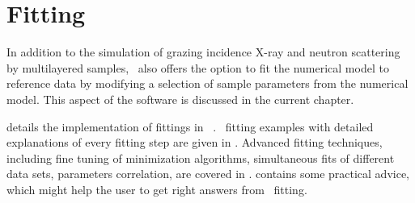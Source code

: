 \newpage
\chapter{Fitting} 

In addition to the simulation of grazing incidence
X-ray and neutron scattering by
multilayered samples, \BornAgain\ also offers the option to
fit the numerical model to reference data by modifying a selection of
sample parameters from the numerical model.  This aspect
of the software is discussed in the current chapter.

 details the
implementation of fittings in \BornAgain\ . 
\Python\ fitting examples with detailed
explanations of every fitting step are given in . Advanced fitting techniques, including fine tuning of minimization
algorithms, simultaneous fits of different data sets, parameters
correlation, are covered in
.  contains some practical advice, which might
help the user to get right answers from \BornAgain\ fitting.

%











